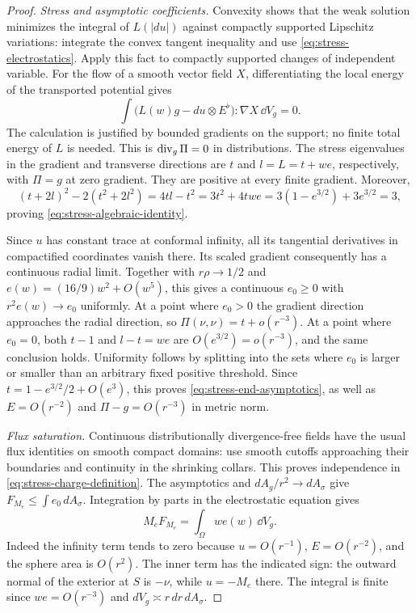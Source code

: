 \begin{proof}
\emph{Stress and asymptotic coefficients.}
Convexity shows that the weak solution minimizes the integral of
$L(|du|)$ against compactly supported Lipschitz variations: integrate
the convex tangent inequality and use \eqref{eq:stress-electrostatics}.
Apply this fact to compactly supported changes of independent variable.
For the flow of a smooth vector field $X$, differentiating the local
energy of the transported potential gives
\[
 \int\big(L(w)g-du\otimes E^\flat\big):\nabla X\,\dd V_g=0.
\]
The calculation is justified by bounded gradients on the support;
no finite total energy of $L$ is needed.  This is
$\operatorname{div}_g\Pi=0$ in distributions.
The stress eigenvalues in the gradient and transverse directions are
$t$ and $l=L=t+we$, respectively, with $\Pi=g$ at zero gradient.
They are positive at every finite gradient.  Moreover,
\[
 (t+2l)^2-2(t^2+2l^2)=4tl-t^2
 =3t^2+4twe=3(1-e^{3/2})+3e^{3/2}=3,
\]
proving \eqref{eq:stress-algebraic-identity}.

Since $u$ has constant trace at conformal infinity, all its tangential
derivatives in compactified coordinates vanish there.  Its scaled
gradient consequently has a continuous radial limit.  Together with
$r\rho\to1/2$ and $e(w)=(16/9)w^2+O(w^5)$, this gives a continuous
$e_0\ge0$ with $r^2e(w)\to e_0$ uniformly.  At a point where
$e_0>0$ the gradient direction approaches the radial direction, so
$\Pi(\nu,\nu)=t+o(r^{-3})$.  At a point where $e_0=0$, both
$t-1$ and $l-t=we$ are $O(e^{3/2})=o(r^{-3})$, and the same conclusion
holds.  Uniformity follows by splitting into the sets where $e_0$
is larger or smaller than an arbitrary fixed positive threshold.
Since $t=1-e^{3/2}/2+O(e^3)$, this proves
\eqref{eq:stress-end-asymptotics}, as well as
$E=O(r^{-2})$ and $\Pi-g=O(r^{-3})$ in metric norm.

\emph{Flux saturation.}
Continuous distributionally divergence-free fields have the usual
flux identities on smooth compact domains: use smooth cutoffs
approaching their boundaries and continuity in the shrinking collars.
This proves independence in \eqref{eq:stress-charge-definition}.
The asymptotics and $dA_g/r^2\to dA_\sigma$ give
$F_{M_e}\le\int e_0\,dA_\sigma$.  Integration by parts in the
electrostatic equation gives
\begin{equation}
 M_eF_{M_e}=\int_\Omega w e(w)\,\dd V_g.
 \label{eq:stress-energy-charge}
\end{equation}
Indeed the infinity term tends to zero because
$u=O(r^{-1})$, $E=O(r^{-2})$, and the sphere area is $O(r^2)$.
The inner term has the indicated sign: the outward normal of the
exterior at $S$ is $-\nu$, while $u=-M_e$ there.  The integral is
finite since $we=O(r^{-3})$ and $dV_g\asymp r\,dr\,dA_\sigma$.


\end{proof}
